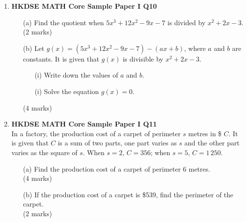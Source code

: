 \documentclass[12pt]{article}
\begin{document}
\begin{enumerate}
	\item \textbf{HKDSE MATH Core Sample Paper I Q10}
	\begin{enumerate}
		\item[(a)] Find the quotient when $5x^3 + 12x^2 - 9x - 7$ is divided by $x^2+2x-3$. \\(2 marks)
		\item[(b)] Let $g(x) = (5x^3 + 12x^2 - 9x - 7) - (ax+b)$, where $a$ and $b$ are constants. It is given that $g(x)$ is divisible by $x^2+2x-3$.
		\begin{enumerate}
			\item[(i)] Write down the values of $a$ and $b$.
			\item[(i)] Solve the equation $g(x) = 0$.
		\end{enumerate} (4 marks)
	\end{enumerate} 

	\item \textbf{HKDSE MATH Core Sample Paper I Q11}\\
	In a factory, the production cost of a carpet of perimeter $s$ metres in \$ $C$. It is given that $C$ is a sum of two parts, one part varies as $s$ and the other part varies as the square of $s$. When $s = 2$, $C = 356$; when $s = 5$, $C = 1\,250$.
	\begin{enumerate}
		\item[(a)] Find the production cost of a carpet of perimeter 6 metres. \\(4 marks)
		\item[(b)] If the production cost of a carpet is \$539, find the perimeter of the carpet. \\(2 marks)
	\end{enumerate}


\end{enumerate}
\end{document}
